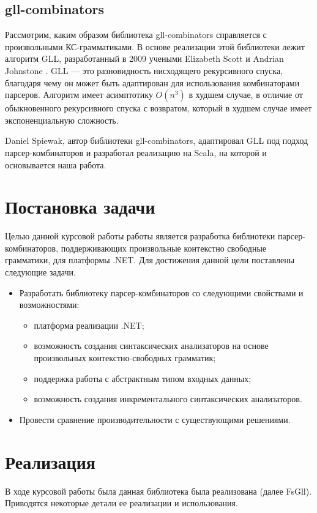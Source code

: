 \documentclass[14pt]{matmex-diploma}
\begin{document}
\subsection{gll-combinators}
Рассмотрим, каким образом библиотека gll-combinators справляется с произвольными КС-грамматиками.
В основе реализации этой библиотеки лежит алгоритм GLL, 
  разработанный в 2009 учеными Elizabeth Scott и Andrian Johnstone \cite{gllsj}. 
GLL --- это разновидность нисходящего рекурсивного спуска, 
  благодаря чему он может быть адаптирован для использования комбинаторами парсеров. 
Алгоритм имеет асимптотику  $O(n^3)$ в худшем случае, в отличие от обыкновенного 
  рекурсивного спуска с возвратом, который в худшем случае имеет экспоненциальную сложность.
  
Daniel Spiewak, автор библиотеки gll-combinators, адаптировал  GLL 
  под подход парсер-комбинаторов и разработал реализацию на Scala, на которой и основывается наша работа. 
  


\section{Постановка задачи}
Целью данной курсовой работы работы является разработка библиотеки парсер-комбинаторов,
поддерживающих произвольные контекстно свободные грамматики, для платформы .NET.
Для достижения данной цели поставлены следующие задачи.
\begin{itemize}
    \item Разработать библиотеку парсер-комбинаторов со следующими свойствами и возможностями:
    \begin{itemize}
        \item платформа реализации .NET;
        \item возможность создания синтаксических анализаторов на основе произвольных контекстно-свободных грамматик;
        \item поддержка работы с абстрактным типом входных данных;
        \item возможность создания инкрементального синтаксических анализаторов.
    \end{itemize}
    \item Провести сравнение производительности с существующими решениями.
\end{itemize}


\section{Реализация}
В ходе курсовой работы была данная библиотека была реализована (далее FsGll). Приводятся некоторые детали ее реализации и использования.
\end{document}
